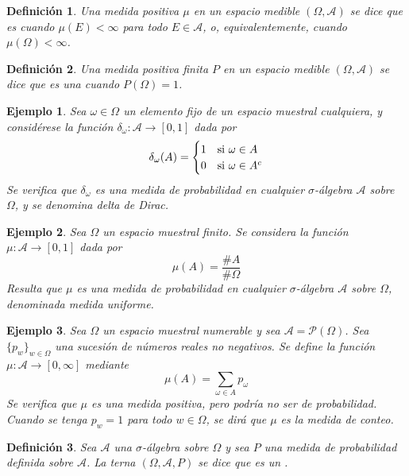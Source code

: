\documentclass[11pt]{report}
\theoremstyle{mytheorem}
\theoremstyle{mydefinition}
\newtheorem{definition}{Definición}
\theoremstyle{myexample}
\newtheorem*{example}{Ejemplo}
\newenvironment{cdefinition} %
  {\begin{mdframed}[
        linewidth=3pt,
        linecolor=c1,
        bottomline=false,
        topline=false,
        rightline=false,
        innerrightmargin=0pt,
        innertopmargin=0pt,
        innerbottommargin=0pt,
        innerleftmargin=1em,
        skipabove=\baselineskip]
    \begin{definition}}
  {\end{definition}\end{mdframed}}
\newcommand{\mybf}[1]{\boldmath\textbf{\color{c1}#1}\unboldmath} %
\begin{document}
\begin{cdefinition}
Una medida positiva $\mu$ en un espacio medible $(\Omega,\mathcal{A})$ se dice que es \mybf{{finita}} cuando $\mu(E) < \infty$ para todo $E \in \mathcal{A}$, o, equivalentemente, cuando $\mu(\Omega) < \infty$.
\end{cdefinition}

\begin{cdefinition}
Una medida positiva finita $P$ en un espacio medible $(\Omega,\mathcal{A})$ se dice que es una \mybf{{medida de probabilidad}} cuando $P(\Omega) = 1$.
\end{cdefinition}

\begin{example}
Sea $\omega \in \Omega$ un elemento fijo de un espacio muestral cualquiera, y considérese la función $\delta_\omega \colon \mathcal{A} \to [0,1]$ dada por 
\[\delta_\omega (A) = \begin{cases}
    1 & $si$ \ \omega \in A \\
    0 & $si$ \ \omega \in A^c
\end{cases}\]
Se verifica que $\delta_\omega$ es una medida de probabilidad en cualquier $\sigma$-álgebra $\mathcal{A}$ sobre $\Omega$, y se denomina \textit{{delta de Dirac}}.
\end{example}

\begin{example}
Sea $\Omega$ un espacio muestral finito. Se considera la función $\mu \colon \mathcal{A} \to [0,1]$ dada por
\[\mu(A) = \frac{\#A}{\#\Omega}\]
Resulta que $\mu$ es una medida de probabilidad en cualquier $\sigma$-álgebra $\mathcal{A}$ sobre $\Omega$, denominada \textit{{medida uniforme}}.
\end{example}

\begin{example}
Sea $\Omega$ un espacio muestral numerable y sea $\mathcal{A} = \mathcal{P}(\Omega)$. Sea $\{p_w\}_{w \in \Omega}$ una sucesión de números reales no negativos. Se define la función $\mu \colon \mathcal{A} \to [0,\infty]$ mediante
\[\mu(A) = \sum_{\omega \in A}p_\omega\]
Se verifica que $\mu$ es una medida positiva, pero podría no ser de probabilidad. Cuando se tenga $p_w = 1$ para todo $w \in \Omega$, se dirá que $\mu$ es la \textit{{medida de conteo}}.
\end{example}

\begin{cdefinition}
Sea $\mathcal{A}$ una $\sigma$-álgebra sobre $\Omega$ y sea $P$ una medida de probabilidad definida sobre $\mathcal{A}$. La terna $(\Omega, \mathcal{A}, P)$ se dice que es un \mybf{{espacio de probabilidad}}.
\end{cdefinition}
\end{document}
